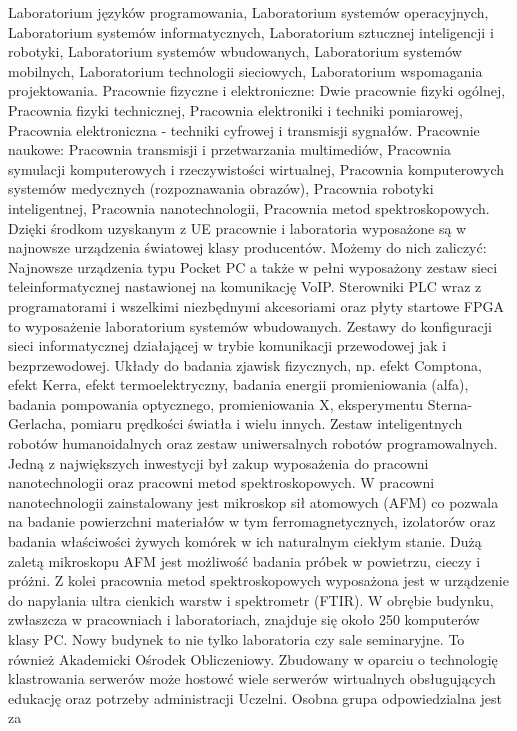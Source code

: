 \documentclass[a4paper,12pt]{article}
\begin{document}
Laboratorium języków programowania,
Laboratorium systemów operacyjnych,
Laboratorium systemów informatycznych,
Laboratorium sztucznej inteligencji i robotyki,
Laboratorium systemów wbudowanych,
Laboratorium systemów mobilnych,
Laboratorium technologii sieciowych,
Laboratorium wspomagania projektowania.
Pracownie fizyczne i elektroniczne:
Dwie pracownie fizyki ogólnej,
Pracownia fizyki technicznej,
Pracownia elektroniki i techniki pomiarowej,
Pracownia elektroniczna - techniki cyfrowej i transmisji sygnałów.
Pracownie naukowe:
Pracownia transmisji i przetwarzania multimediów,
Pracownia symulacji komputerowych i rzeczywistości wirtualnej,
Pracownia komputerowych systemów medycznych (rozpoznawania obrazów),
Pracownia robotyki inteligentnej,
Pracownia nanotechnologii,
Pracownia metod spektroskopowych.
Dzięki środkom uzyskanym z UE pracownie i laboratoria wyposażone są w najnowsze urządzenia światowej
klasy producentów. Możemy do nich zaliczyć:
Najnowsze urządzenia typu Pocket PC a także w pełni wyposażony zestaw sieci teleinformatycznej
nastawionej na komunikację VoIP.
Sterowniki PLC wraz z programatorami i wszelkimi niezbędnymi akcesoriami oraz płyty startowe FPGA
to wyposażenie laboratorium systemów wbudowanych.
Zestawy do konfiguracji sieci informatycznej działającej w trybie komunikacji przewodowej jak i
bezprzewodowej.
Układy do badania zjawisk fizycznych, np. efekt Comptona, efekt Kerra, efekt termoelektryczny, badania
energii promieniowania (alfa), badania pompowania optycznego, promieniowania X, eksperymentu
Sterna-Gerlacha, pomiaru prędkości światła i wielu innych.
Zestaw inteligentnych robotów humanoidalnych oraz zestaw uniwersalnych robotów programowalnych.
Jedną z największych inwestycji był zakup wyposażenia do pracowni nanotechnologii oraz pracowni metod
spektroskopowych. W pracowni nanotechnologii zainstalowany jest mikroskop sił atomowych (AFM) co
pozwala na badanie powierzchni materiałów w tym ferromagnetycznych, izolatorów oraz badania właściwości
żywych komórek w ich naturalnym ciekłym stanie. Dużą zaletą mikroskopu AFM jest możliwość badania
próbek w powietrzu, cieczy i próżni. Z kolei pracownia metod spektroskopowych wyposażona jest w
urządzenie do napylania ultra cienkich warstw i spektrometr (FTIR).
W obrębie budynku, zwłaszcza w pracowniach i laboratoriach, znajduje się około 250 komputerów klasy PC.
Nowy budynek to nie tylko laboratoria czy sale seminaryjne. To również Akademicki Ośrodek Obliczeniowy.
Zbudowany w oparciu o technologię klastrowania serwerów może hostowć wiele serwerów wirtualnych
obsługujących edukację oraz potrzeby administracji Uczelni. Osobna grupa odpowiedzialna jest za
\end{document}
